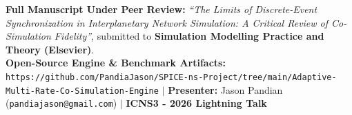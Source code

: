 \documentclass[9pt]{article}
\begin{document}
\vspace{0.08cm}

\begin{tcolorbox}[enhanced, colback=spaceNavy, colframe=electricCyan, boxrule=1.2pt, arc=4pt,
    left=8pt, right=8pt, top=3.5pt, bottom=3.5pt]
    \centering
    {\fontsize{7.5pt}{9pt}\selectfont \color{white}
    \textbf{Full Manuscript Under Peer Review:} \textit{``The Limits of Discrete-Event Synchronization in Interplanetary Network Simulation: A Critical Review of Co-Simulation Fidelity''}, submitted to \textbf{\color{pillCyan}Simulation Modelling Practice and Theory (Elsevier)}.}\\[2pt]
    {\fontsize{6.8pt}{8.2pt}\selectfont \color{gray!30}
    \textbf{Open-Source Engine \& Benchmark Artifacts:} \texttt{https://github.com/PandiaJason/SPICE-ns-Project/tree/main/Adaptive-Multi-Rate-Co-Simulation-Engine} \quad $\vert$ \quad
    \textbf{Presenter:} Jason Pandian (\texttt{pandiajason@gmail.com}) \quad $\vert$ \quad \textbf{ICNS3 - 2026 Lightning Talk}}
\end{tcolorbox}
\end{document}
